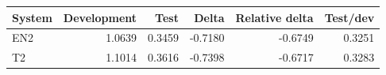 \begin{tabular}{lrrrrr}
\toprule
System & Development & Test & Delta & Relative delta & Test/dev \\
\midrule
EN2 & 1.0639 & 0.3459 & -0.7180 & -0.6749 & 0.3251 \\
T2 & 1.1014 & 0.3616 & -0.7398 & -0.6717 & 0.3283 \\
\bottomrule
\end{tabular}
